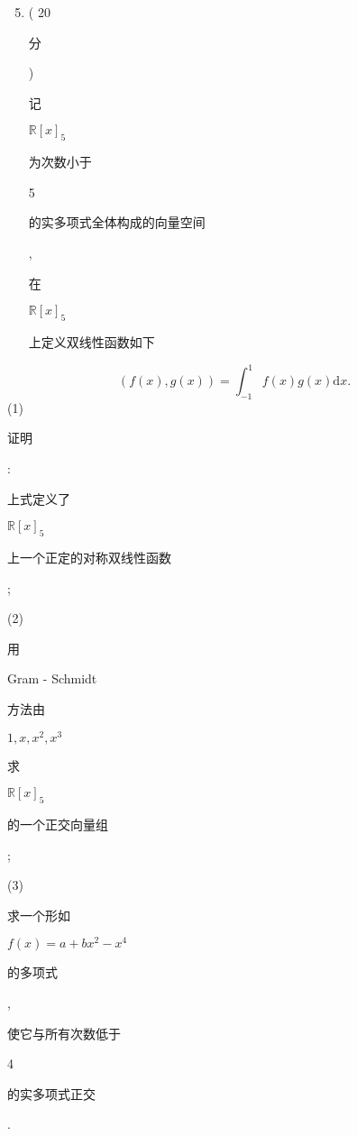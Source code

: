 \documentclass[10pt]{article}
\begin{document}
\begin{enumerate}
  \setcounter{enumi}{4}
  \item ( 20 \begin{CJK}{UTF8}{mj}分\end{CJK}) \begin{CJK}{UTF8}{mj}记\end{CJK} $\mathbb{R}[x]_{5}$ \begin{CJK}{UTF8}{mj}为次数小于\end{CJK} 5 \begin{CJK}{UTF8}{mj}的实多项式全体构成的向量空间\end{CJK}, \begin{CJK}{UTF8}{mj}在\end{CJK} $\mathbb{R}[x]_{5}$ \begin{CJK}{UTF8}{mj}上定义双线性函数如下\end{CJK}
\end{enumerate}
$$
(f(x), g(x))=\int_{-1}^{1} f(x) g(x) \mathrm{d} x .
$$
(1) \begin{CJK}{UTF8}{mj}证明\end{CJK}: \begin{CJK}{UTF8}{mj}上式定义了\end{CJK} $\mathbb{R}[x]_{5}$ \begin{CJK}{UTF8}{mj}上一个正定的对称双线性函数\end{CJK};

(2) \begin{CJK}{UTF8}{mj}用\end{CJK} Gram - Schmidt \begin{CJK}{UTF8}{mj}方法由\end{CJK} $1, x, x^{2}, x^{3}$ \begin{CJK}{UTF8}{mj}求\end{CJK} $\mathbb{R}[x]_{5}$ \begin{CJK}{UTF8}{mj}的一个正交向量组\end{CJK};

(3) \begin{CJK}{UTF8}{mj}求一个形如\end{CJK} $f(x)=a+b x^{2}-x^{4}$ \begin{CJK}{UTF8}{mj}的多项式\end{CJK}, \begin{CJK}{UTF8}{mj}使它与所有次数低于\end{CJK} 4 \begin{CJK}{UTF8}{mj}的实多项式正交\end{CJK}.
\end{document}
